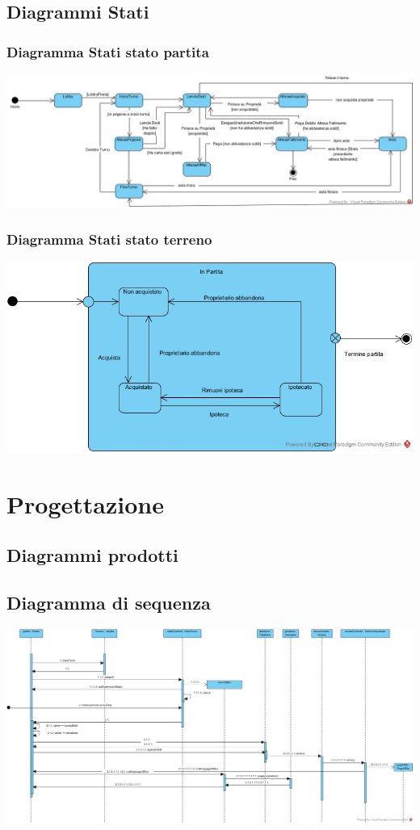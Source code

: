 \documentclass{article}
\begin{document}
\subsection{Diagrammi Stati}
\subsubsection{Diagramma Stati stato partita}
\includegraphics[width=\textwidth]{DiagrammaStatiStatoPartita}
\subsubsection{Diagramma Stati stato terreno}
\includegraphics[width=\textwidth]{DiagrammaStatiStatoTerreno}



\section{Progettazione}
\subsection{Diagrammi prodotti}
\subsection{Diagramma di sequenza}
\href{https://github.com/UnimibSoftEngCourse2022/progetto-monopoly-1-gangoffour2/blob/feat/doc/doc/img/DiagrammaDiSequenzaDiProgettazioneTurnoGiocatore.jpg?raw=true}
	{\includegraphics[width=\textwidth]{DiagrammaDiSequenzaDiProgettazioneTurnoGiocatore}}
\end{document}
